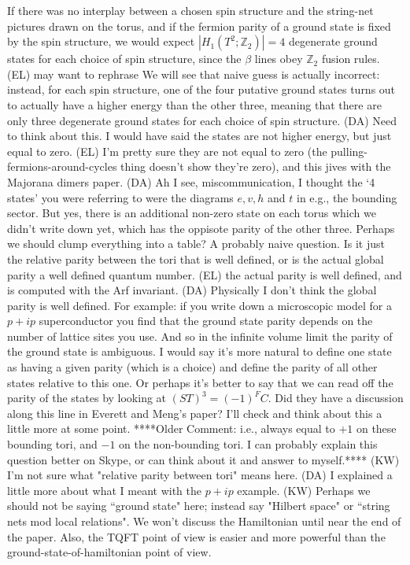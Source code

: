 \documentclass[12pt,a4paper]{article}
\newcommand{\zt}{\mathbb{Z}_2}
\newcommand{\kw}[1]{{\color{kwcolor}\footnotesize{(KW) #1}}}
\newcommand{\dave}[1]{{\color{ao(english)}\footnotesize{(DA) #1}}}
\newcommand{\ethan}[1]{{\color{amethyst}\footnotesize{(EL) #1}}}
\begin{document}
If there was no interplay between a chosen spin structure and the string-net pictures drawn on the torus, 
and if the fermion parity of a ground state is fixed by the spin structure, we would expect $|H_1(T^2;\zt)|=4$ 
degenerate ground states 
for each choice of spin structure, since the $\beta$ lines obey $\zt$ fusion rules. \ethan{may want to rephrase}
We will see that naive guess is actually incorrect: instead, for each spin structure, 
one of the four putative ground states turns out to actually have a higher energy 
than the other three, meaning that there are only three degenerate ground states for each choice of spin structure. 
\dave{Need to think about this. 
I would have said the states are not higher energy, but just equal to zero. 
\ethan{I'm pretty sure they are not equal to zero (the pulling-fermions-around-cycles 
thing doesn't show they're zero), and this jives with the Majorana dimers paper.}
\dave{Ah I see, miscommunication, I thought the `4 states' you were referring to were the 
diagrams $e,v,h$ and $t$ in e.g., the bounding sector.
But yes, there is an additional non-zero state on each torus which we didn't write down yet, 
which has the oppisote parity of the other three. 
Perhaps we should clump everything into a table?}
A probably naive question. 
Is it just the relative parity between the tori that is well defined, or is the actual global 
parity a well defined quantum number. 
\ethan{the actual parity is well defined, and is computed with the Arf invariant.
\dave{Physically I don't think the global parity is well defined. 
For example: if you write down a microscopic model for a $p+ip$ superconductor you find that 
the ground state parity depends on the number of lattice sites you use.
And so in the infinite volume limit the parity of the ground state is ambiguous.
I would say it's more natural to define one state as having a given parity 
(which is a choice) and define the parity of all other states relative to this one.
Or perhaps it's better to say that we can read off the parity of the states by looking at $(ST)^3 = (-1)^FC$.
Did they have a discussion along this line in Everett and Meng's paper? I'll check and think about this a little more at some point.
}}
****Older Comment: i.e.,  always equal to $+1$ on these bounding tori, and $-1$ on the non-bounding tori.
I can probably explain this question better on Skype, or can think about it and answer to myself.****}
\kw{I'm not sure what "relative parity between tori" means here.}
\dave{I explained a little more about what I meant with the $p+ip$ example.}
\kw{Perhaps we should not be saying ``ground state" here; instead say "Hilbert space" or ``string nets mod local relations".
We won't discuss the Hamiltonian until near the end of the paper.
Also, the TQFT point of view is easier and more powerful than the ground-state-of-hamiltonian point of view.}
\end{document}
